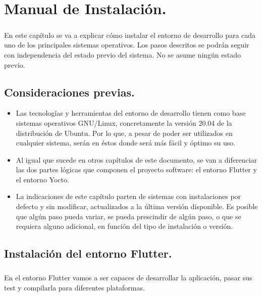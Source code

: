 \chapter{Manual de Instalación.}\label{sec:ManualDeInstalacion}

\paragraph{}En este capítulo se va a explicar cómo instalar el entorno de desarrollo
para cada uno de los principales sistemas operativos. Los pasos descritos se podrán
seguir con independencia del estado previo del sistema. No se asume ningún estado previo.

\section{Consideraciones previas.}

\begin{itemize}
    \item Las tecnologías y herramientas del entorno de desarrollo tienen como base
    sistemas operativos GNU/Linux, concretamente la versión 20.04 de la distribución
    de Ubuntu. Por lo que, a pesar de poder ser utilizados en cualquier sistema,
    serán en éstos donde será más fácil y óptimo su uso.

    \item Al igual que sucede en otros capítulos de este documento, se van a diferenciar
    las dos partes lógicas que componen el proyecto software: el entorno Flutter y el
    entorno Yocto.

    \item La indicaciones de este capítulo parten de sistemas con instalaciones por defecto
    y sin modificar, actualizados a la última versión disponible. Es posible que algún
    paso pueda variar, se pueda prescindir de algún paso, o que se requiera alguno
    adicional, en función del tipo de instalación o versión.
\end{itemize}

\section{Instalación del entorno Flutter.}\label{sec:entflutter}

\paragraph{}En el entorno Flutter vamos a ser capaces de desarrollar la aplicación,
pasar sus test y compilarla para diferentes plataformas.

